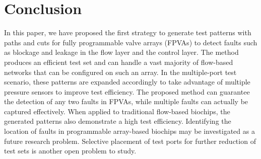 \section{Conclusion}\label{sec:conclusion}

In this paper, we have proposed the first strategy to generate
test patterns with paths and cuts for fully programmable valve
arrays (FPVAs) to detect faults such as blockage and leakage in the flow
layer and the control layer. The method produces an efficient test set and
can handle a vast majority of flow-based networks that can be
configured on such an array.
In the multiple-port test scenario, these patterns are expanded accordingly to take
advantage of multiple pressure sensors to improve test efficiency.
The proposed method can guarantee 
the detection of any two faults in FPVAs, while multiple faults can
actually be captured effectively. 
When applied to traditional flow-based biochips,
the generated patterns also demonstrate a high test efficiency. Identifying the
location of faults in programmable array-based biochips may be investigated
as a future research problem. Selective placement of test ports for
further reduction of test sets is another open problem to study.


